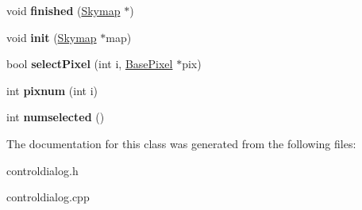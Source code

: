 \begin{DoxyCompactItemize}
\item 
\hypertarget{classControlDialog_af5840cb6c830c1d5b5eb999e4132fa70}{
void {\bfseries finished} (\hyperlink{classSkymap}{Skymap} $\ast$)}
\label{classControlDialog_af5840cb6c830c1d5b5eb999e4132fa70}

\item 
\hypertarget{classControlDialog_a1c445b89fae1e0a3e0cb381b152065d4}{
void {\bfseries init} (\hyperlink{classSkymap}{Skymap} $\ast$map)}
\label{classControlDialog_a1c445b89fae1e0a3e0cb381b152065d4}

\item 
\hypertarget{classControlDialog_a6cc8a2634dfd92d9d1d359aaf747f8df}{
bool {\bfseries selectPixel} (int i, \hyperlink{classBasePixel}{BasePixel} $\ast$pix)}
\label{classControlDialog_a6cc8a2634dfd92d9d1d359aaf747f8df}

\item 
\hypertarget{classControlDialog_a97df81a6bafec3db8b66d5dcc2909800}{
int {\bfseries pixnum} (int i)}
\label{classControlDialog_a97df81a6bafec3db8b66d5dcc2909800}

\item 
\hypertarget{classControlDialog_a137022e8437dc3683452f3c63b5d3373}{
int {\bfseries numselected} ()}
\label{classControlDialog_a137022e8437dc3683452f3c63b5d3373}

\end{DoxyCompactItemize}


The documentation for this class was generated from the following files:\begin{DoxyCompactItemize}
\item 
controldialog.h\item 
controldialog.cpp\end{DoxyCompactItemize}
